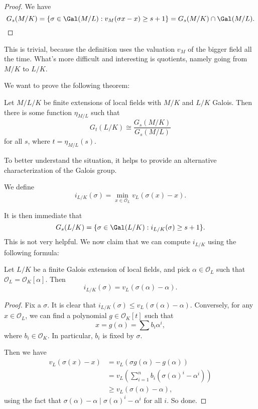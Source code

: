 \documentclass[a4paper]{article}
\begin{document}
\begin{proof}
  We have
  \[
    G_s(M/K) = \{\sigma \in \Gal(M/L): v_M(\sigma x - x) \geq s + 1\} = G_s(M/K) \cap \Gal(M/L).
  \]
\end{proof}
This is trivial, because the definition uses the valuation $v_M$ of the bigger field all the time. What's more difficult and interesting is quotients, namely going from $M/K$ to $L/K$.

We want to prove the following theorem:
\begin{thm}
  Let $M/L/K$ be finite extensions of local fields with $M/K$ and $L/K$ Galois. Then there is some function $\eta_{M/L}$ such that
  \[
    G_t(L/K) \cong \frac{G_s(M/K)}{G_s(M/L)}
  \]
  for all $s$, where $t = \eta_{M/L}(s)$.
\end{thm}

To better understand the situation, it helps to provide an alternative characterization of the Galois group.

\begin{defi}[$i_{L/K}$]
  We define
  \[
    i_{L/K}(\sigma) = \min_{x \in \mathcal{O}_L} v_L(\sigma(x) - x).
  \]
\end{defi}
It is then immediate that
\[
  G_s(L/K) = \{\sigma \in \Gal(L/K): i_{L/K}(\sigma) \geq s + 1\}.
\]
This is not very helpful. We now claim that we can compute $i_{L/K}$ using the following formula:
\begin{prop}
  Let $L/K$ be a finite Galois extension of local fields, and pick $\alpha \in \mathcal{O}_L$ such that $\mathcal{O}_L = \mathcal{O}_K[\alpha]$. Then
  \[
    i_{L/K}(\sigma) = v_L(\sigma(\alpha) - \alpha).
  \]
\end{prop}

\begin{proof}
  Fix a $\sigma$. It is clear that $i_{L/K}(\sigma) \leq v_L(\sigma(\alpha) - \alpha)$. Conversely, for any $x \in \mathcal{O}_L$, we can find a polynomial $g \in \mathcal{O}_K[t]$ such that
  \[
    x = g(\alpha) = \sum b_i \alpha^i,
  \]
  where $b_i \in \mathcal{O}_K$. In particular, $b_i$ is fixed by $\sigma$.

  Then we have
  \begin{align*}
    v_L(\sigma (x) - x) &= v_L(\sigma g(\alpha) - g(\alpha)) \\
    &= v_L\left( \sum_{i = 1}^n b_i (\sigma(\alpha)^i - \alpha^i)\right)\\
    &\geq v_L(\sigma(\alpha) - \alpha),
  \end{align*}
  using the fact that $\sigma(\alpha) - \alpha \mid \sigma(\alpha)^i - \alpha^i$ for all $i$. So done.
\end{proof}
\end{document}
